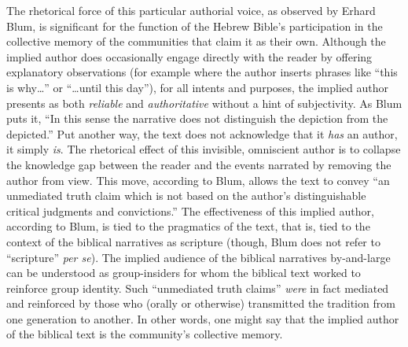 The rhetorical force of this particular authorial voice, as observed by
Erhard Blum, is significant for the function of the Hebrew Bible's
participation in the collective memory of the communities that claim it
as their own. Although the implied author does occasionally engage
directly with the reader by offering explanatory observations (for
example where the author inserts phrases like ``this is why\ldots{}'' or
``\ldots{}until this day''), for all intents and purposes, the implied
author presents as both \emph{reliable} and \emph{authoritative} without
a hint of subjectivity. As Blum puts it, ``In this sense the narrative
does not distinguish the depiction from the
depicted.''\autocite[33]{blum_barton-etal2007} Put another way, the text
does not acknowledge that it \emph{has} an author, it simply \emph{is}.
The rhetorical effect of this invisible, omniscient author is to
collapse the knowledge gap between the reader and the events narrated by
removing the author from view. This move, according to Blum, allows the
text to convey ``an unmediated truth claim which is not based on the
author's distinguishable critical judgments and
convictions.''\autocite[33]{blum_barton-etal2007} The effectiveness of
this implied author, according to Blum, is tied to the pragmatics of the
text, that is, tied to the context of the biblical narratives as
scripture (though, Blum does not refer to ``scripture'' \emph{per se}).
The implied audience of the biblical narratives by-and-large can be
understood as group-insiders for whom the biblical text worked to
reinforce group identity. Such ``unmediated truth claims'' \emph{were}
in fact mediated and reinforced by those who (orally or otherwise)
transmitted the tradition from one generation to
another.\autocite[33]{blum_barton-etal2007} In other words, one might
say that the implied author of the biblical text is the community's
collective memory.\autocite[Blum writes, ``If we assume that the
traditional literature was primarily transmitted through oral means,
than the narrator who is speaking supplies the material with a personal
presence; he is not present as an author who judges and evaluates his
sources from a critical distance, but as a `transmitter' who
participates in the tradition itself and is able to lend it credence
through his own personality, his standing, and/or his
office.''][33]{blum_barton-etal2007}

